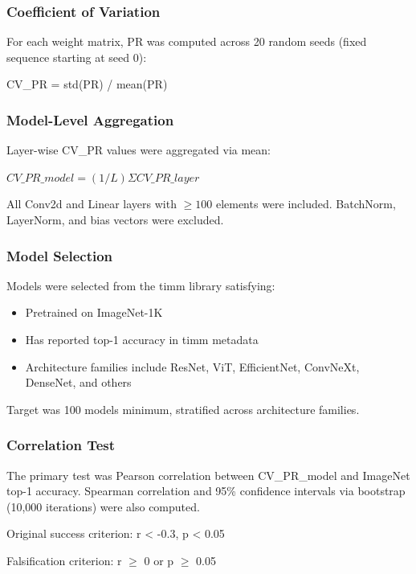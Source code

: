 \subsubsection{Coefficient of Variation}

For each weight matrix, PR was computed across 20 random seeds (fixed sequence starting at seed 0):

CV\_PR = std(PR) / mean(PR)

\subsubsection{Model-Level Aggregation}

Layer-wise CV\_PR values were aggregated via mean:

$CV\_PR\_model = (1/L) \Sigma CV\_PR\_layer$

All Conv2d and Linear layers with $\geq 100$ elements were included. BatchNorm, LayerNorm, and bias vectors were excluded.

\subsubsection{Model Selection}

Models were selected from the timm library satisfying:
\begin{itemize}
\item Pretrained on ImageNet-1K
\item Has reported top-1 accuracy in timm metadata
\item Architecture families include ResNet, ViT, EfficientNet, ConvNeXt, DenseNet, and others
\end{itemize}

Target was 100 models minimum, stratified across architecture families.

\subsubsection{Correlation Test}

The primary test was Pearson correlation between CV\_PR\_model and ImageNet top-1 accuracy. Spearman correlation and 95\% confidence intervals via bootstrap (10,000 iterations) were also computed.

Original success criterion: r < -0.3, p < 0.05

Falsification criterion: r $\geq$ 0 or p $\geq$ 0.05
